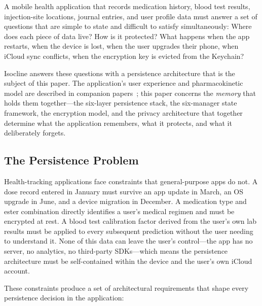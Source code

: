 \documentclass[11pt,a4paper]{article}
\begin{document}
A mobile health application that records medication history, blood test
results, injection-site locations, journal entries, and user profile data
must answer a set of questions that are simple to state and difficult to
satisfy simultaneously: Where does each piece of data live? How is it
protected? What happens when the app restarts, when the device is lost, when
the user upgrades their phone, when iCloud sync conflicts, when the
encryption key is evicted from the Keychain?

Isocline answers these questions with a persistence architecture that is the
subject of this paper. The application's user experience and pharmacokinetic
model are described in companion papers~\cite{xtux,xtpk}; this paper concerns
the \emph{memory} that holds them together---the six-layer persistence stack,
the six-manager state framework, the encryption model, and the privacy
architecture that together determine what the application remembers, what it
protects, and what it deliberately forgets.

\subsection{The Persistence Problem}
\label{sec:persistence_problem}

Health-tracking applications face constraints that general-purpose apps do
not. A dose record entered in January must survive an app update in March,
an OS upgrade in June, and a device migration in December. A medication type
and ester combination directly identifies a user's medical regimen and must
be encrypted at rest. A blood test calibration factor derived from the user's
own lab results must be applied to every subsequent prediction without the
user needing to understand it. None of this data can leave the user's
control---the app has no server, no analytics, no third-party SDKs---which
means the persistence architecture must be self-contained within the device
and the user's own iCloud account.

These constraints produce a set of architectural requirements that shape
every persistence decision in the application:
\end{document}
